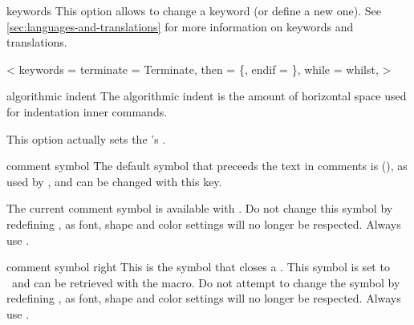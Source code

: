\documentclass[a4paper, 11pt]{article}
\begin{document}
\begin{option}{keywords}{}
    This option allows to change a keyword (or define a new one). See \cref{sec:languages-and-translations} for more information on keywords and translations.
\end{option}

\begin{tcblisting}{}
    \begin{algorithmic}<
            keywords = {
                terminate = Terminate, %
                then = \{, %
                endif = \}, %
                while = whilst,  %
            }
        >
        \While{\True}
            \EndIf
        \EndWhile
    \end{algorithmic}
\end{tcblisting}

\begin{option}{algorithmic indent}{}
    The algorithmic indent is the amount of horizontal space used for indentation inner commands.

    This option actually sets the 's .
\end{option}

\begin{option}{comment symbol}{}
    The default symbol that preceeds the text in comments is  (\CommentSymbol), as used by , and can be changed with this key.

    The current comment symbol is available with . Do not change this symbol by redefining , as font, shape and color settings will no longer be respected. Always use .
\end{option}

\begin{option}{comment symbol right}{}
    This is the symbol that closes a . This symbol is set to \CommentSymbolRight\ and can be retrieved with the  macro. Do not attempt to change the symbol by redefining , as font, shape and color settings will no longer be respected. Always use .
\end{option}
\end{document}
